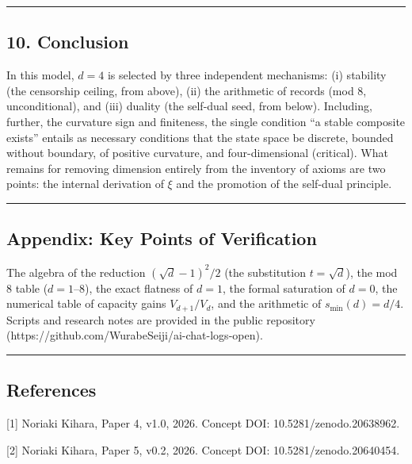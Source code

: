 \documentclass[
]{article}
\begin{document}
\begin{center}\rule{0.5\linewidth}{0.5pt}\end{center}

\subsection{10. Conclusion}\label{conclusion}

In this model, \(d=4\) is selected by three independent mechanisms: (i)
stability (the censorship ceiling, from above), (ii) the arithmetic of
records (mod 8, unconditional), and (iii) duality (the self-dual seed,
from below). Including, further, the curvature sign and finiteness, the
single condition ``a stable composite exists'' entails as necessary
conditions that the state space be discrete, bounded without boundary,
of positive curvature, and four-dimensional (critical). What remains for
removing dimension entirely from the inventory of axioms are two points:
the internal derivation of \(\xi\) and the promotion of the self-dual
principle.

\begin{center}\rule{0.5\linewidth}{0.5pt}\end{center}

\subsection{Appendix: Key Points of
Verification}\label{appendix-key-points-of-verification}

The algebra of the reduction \((\sqrt d-1)^2/2\) (the substitution
\(t=\sqrt d\)), the mod 8 table (\(d=1\)--\(8\)), the exact flatness of
\(d=1\), the formal saturation of \(d=0\), the numerical table of
capacity gains \(V_{d+1}/V_d\), and the arithmetic of
\(s_{\min}(d)=d/4\). Scripts and research notes are provided in the
public repository (https://github.com/WurabeSeiji/ai-chat-logs-open).

\begin{center}\rule{0.5\linewidth}{0.5pt}\end{center}

\subsection{References}\label{references}

{[}1{]} Noriaki Kihara, Paper 4, v1.0, 2026. Concept DOI:
10.5281/zenodo.20638962.

{[}2{]} Noriaki Kihara, Paper 5, v0.2, 2026. Concept DOI: 10.5281/zenodo.20640454.
\end{document}
